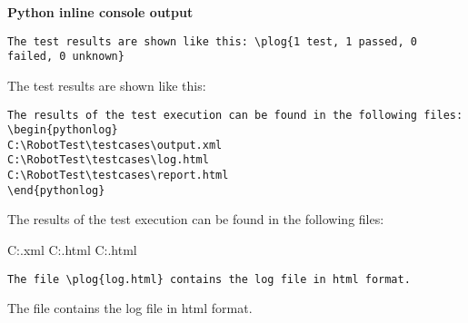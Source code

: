 \documentclass[a4paper,10pt]{report}
\begin{document}
\vspace{2ex}

\textbf{Python inline console output}
\begin{verbatim}
The test results are shown like this: \plog{1 test, 1 passed, 0 failed, 0 unknown}
\end{verbatim}

The test results are shown like this: 

\vspace{2ex}

\begin{verbatim}
The results of the test execution can be found in the following files:
\begin{pythonlog}
C:\RobotTest\testcases\output.xml
C:\RobotTest\testcases\log.html
C:\RobotTest\testcases\report.html
\end{pythonlog}
\end{verbatim}

The results of the test execution can be found in the following files:
\begin{pythonlog}
C:\RobotTest\testcases\output.xml
C:\RobotTest\testcases\log.html
C:\RobotTest\testcases\report.html
\end{pythonlog}

\vspace{2ex}

\begin{verbatim}
The file \plog{log.html} contains the log file in html format.
\end{verbatim}

The file  contains the log file in html format.

\end{document}
